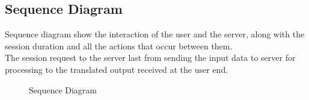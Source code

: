\subsection{Sequence Diagram}
{\normalsize{Sequence diagram show the interaction of the user and the server, along with the session duration and all the actions that occur between them. \\ 
The session request to the server last from sending the input data to server for processing to the translated output received at the user end. \\
}}
\newline
\begin{figure}[h]
  \begin{center}
  \caption{Sequence Diagram}
  \end{center}
\end{figure}

\clearpage
